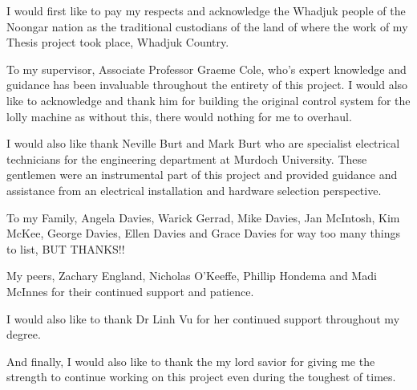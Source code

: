 I would first like to pay my respects and acknowledge the Whadjuk people of the Noongar nation as the traditional custodians of the land of where the work of my Thesis project took place, Whadjuk Country.

To my supervisor, Associate Professor Graeme Cole,  who's expert knowledge and guidance has been invaluable throughout the entirety of this project. I would also like to acknowledge and thank him for building the original control system for the lolly machine as without this, there would nothing for me to overhaul.

I would also like thank Neville Burt and Mark Burt who are specialist electrical technicians for the engineering department at Murdoch University. These gentlemen were an instrumental part of this project and provided guidance and assistance from an electrical installation and hardware selection perspective.

To my Family, Angela Davies, Warick Gerrad, Mike Davies, Jan McIntosh, Kim McKee, George Davies, Ellen Davies and Grace Davies for way too many things to list, BUT THANKS!!

My peers, Zachary England, Nicholas O'Keeffe, Phillip Hondema and Madi McInnes for their continued support and patience.

I would also like to thank Dr Linh Vu for her continued support throughout my degree. 

And finally, I would also like to thank the my lord savior for giving me the strength to continue working on this project even during the toughest of times.

